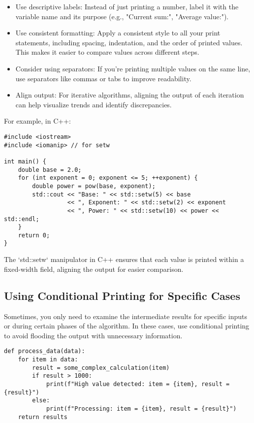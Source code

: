 \documentclass{article}
\begin{document}
{{{\begin{itemize}
    \item Use descriptive labels: Instead of just printing a number, label it with the variable name and its purpose (e.g., "Current sum:", "Average value:").
    \item Use consistent formatting: Apply a consistent style to all your print statements, including spacing, indentation, and the order of printed values. This makes it easier to compare values across different steps.
    \item Consider using separators: If you're printing multiple values on the same line, use separators like commas or tabs to improve readability.
    \item Align output: For iterative algorithms, aligning the output of each iteration can help visualize trends and identify discrepancies.
\end{itemize}

For example, in C++:

\begin{verbatim}
#include <iostream>
#include <iomanip> // for setw

int main() {
    double base = 2.0;
    for (int exponent = 0; exponent <= 5; ++exponent) {
        double power = pow(base, exponent);
        std::cout << "Base: " << std::setw(5) << base
                  << ", Exponent: " << std::setw(2) << exponent
                  << ", Power: " << std::setw(10) << power << std::endl;
    }
    return 0;
}

\end{verbatim}

The `std::setw` manipulator in C++ ensures that each value is printed within a fixed-width field, aligning the output for easier comparison.

\subsection*{Using Conditional Printing for Specific Cases}

Sometimes, you only need to examine the intermediate results for specific inputs or during certain phases of the algorithm. In these cases, use conditional printing to avoid flooding the output with unnecessary information.

\begin{verbatim}
def process_data(data):
    for item in data:
        result = some_complex_calculation(item)
        if result > 1000:
            print(f"High value detected: item = {item}, result = {result}")
        else:
            print(f"Processing: item = {item}, result = {result}")
    return results
\end{verbatim}

}}}
\end{document}
